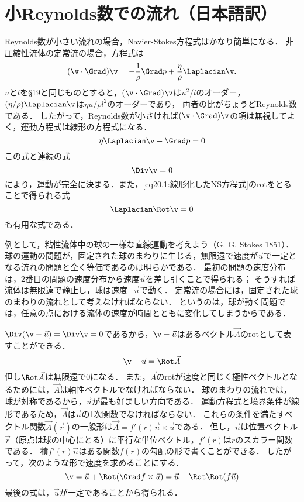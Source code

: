 \section{\spade 小Reynolds数での流れ（日本語訳）}
Reynolds数が小さい流れの場合，Navier-Stokes方程式はかなり簡単になる．
非圧縮性流体の定常流の場合，方程式は
\[
    (\v\cdot\Grad)\v = - \frac{1}{\rho} \Grad p + \frac{\eta}{\rho} \Laplacian \v .
\]
$u$と$l$を\S19と同じものとすると，$(\v\cdot\Grad)\v$は$u^2/l$のオーダー，
$(\eta/\rho)\Laplacian\v$は$\eta u/\rho l^2$のオーダーであり，
両者の比がちょうどReynolds数である．
したがって，Reynolds数が小さければ$(\v\cdot\Grad)\v$の項は無視してよく，運動方程式は線形の方程式になる．
\begin{equation}\label{eq20.1:線形化したNS方程式}
    \eta \Laplacian\v - \Grad p = 0
\end{equation}
この式と連続の式
\begin{equation}\label{eq20.2:連続の式（Stokes流）}
    \Div\v=0
\end{equation}
により，運動が完全に決まる．また，\eqref{eq20.1:線形化したNS方程式}のrotをとることで得られる式
\begin{equation}\label{eq20.3:rotvに対するLaplace方程式}
    \Laplacian \Rot\v = 0
\end{equation}
も有用な式である．


例として，粘性流体中の球の一様な直線運動を考えよう（G. G. Stokes 1851）．
球の運動の問題が，固定された球のまわりに生じる，無限遠で速度が$\vec{u}$で一定となる流れの問題と全く等価であるのは明らかである．
最初の問題の速度分布は，2番目の問題の速度分布から速度$\vec{u}$を差し引くことで得られる；
そうすれば流体は無限遠で静止し，球は速度$-\vec{u}$で動く．
定常流の場合には，固定された球のまわりの流れとして考えなければならない．
というのは，球が動く問題では，任意の点における流体の速度が時間とともに変化してしまうからである．


$\Div(\v-\vec{u})=\Div\v=0$であるから，$\v-\vec{u}$はあるベクトル$\vec{A}$のrotとして表すことができる．
\[
    \v - \vec{u} = \Rot\vec{A}
\]
但し$\Rot\vec{A}$は無限遠で0になる．
また，$\vec{A}$のrotが速度と同じく極性ベクトルとなるためには，$\vec{A}$は軸性ベクトルでなければならない．
球のまわりの流れでは，球が対称であるから，$\vec{u}$が最も好ましい方向である．
運動方程式と境界条件が線形であるため，$\vec{A}$は$\vec{u}$の1次関数でなければならない．
これらの条件を満たすベクトル関数$\Vec{A}(\vec{r})$の一般形は$\Vec{A}=f'(r) \vec{n}\times\vec{u}$である．
但し，$\vec{n}$は位置ベクトル$\vec{r}$（原点は球の中心にとる）に平行な単位ベクトル，$f'(r)$は$r$のスカラー関数である．
積$f'(r)\vec{n}$はある関数$f(r)$の勾配の形で書くことができる．
したがって，次のような形で速度を求めることにする．
\begin{equation}\label{eq20.4:Stokes流でのvの表現}
    \v = \vec{u} + \Rot(\Grad f \times \vec{u})
    = \vec{u} + \Rot\Rot(f\vec{u})
\end{equation}
最後の式は，$\vec{u}$が一定であることから得られる．



